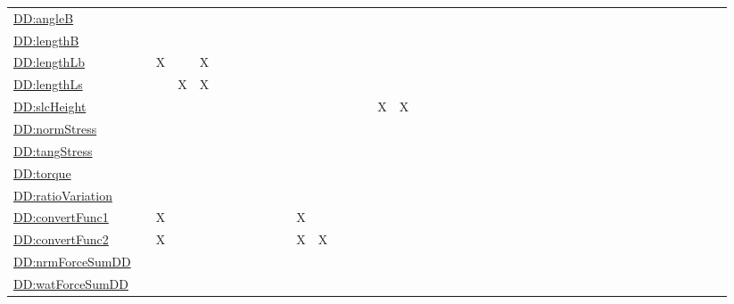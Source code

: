 \documentclass[12pt]{article}
\begin{document}
\begin{longtable}{l l l l l l l l l l l l l l l l l l l l l l l l l l l l l l l l l l l l l l l l l l l}
\\
\hyperref[DD:angleB]{DD:angleB} &  &  &  &  &  &  &  &  &  &  &  &  &  &  &  &  &  &  &  &  &  &  &  &  &  &  &  &  &  &  &  &  &  &  &  &  &  &  &  &  &  & 
\\
\hyperref[DD:lengthB]{DD:lengthB} &  &  &  &  &  &  &  &  &  &  &  &  &  &  &  &  &  &  &  &  &  &  &  &  &  &  &  &  &  &  &  &  &  &  &  &  &  &  &  &  &  & 
\\
\hyperref[DD:lengthLb]{DD:lengthLb} &  & X &  & X &  &  &  &  &  &  &  &  &  &  &  &  &  &  &  &  &  &  &  &  &  &  &  &  &  &  &  &  &  &  &  &  &  &  &  &  &  & 
\\
\hyperref[DD:lengthLs]{DD:lengthLs} &  &  & X & X &  &  &  &  &  &  &  &  &  &  &  &  &  &  &  &  &  &  &  &  &  &  &  &  &  &  &  &  &  &  &  &  &  &  &  &  &  & 
\\
\hyperref[DD:slcHeight]{DD:slcHeight} &  &  &  &  &  &  &  &  &  &  &  &  &  &  &  & X & X &  &  &  &  &  &  &  &  &  &  &  &  &  &  &  &  &  &  &  &  &  &  &  &  & 
\\
\hyperref[DD:normStress]{DD:normStress} &  &  &  &  &  &  &  &  &  &  &  &  &  &  &  &  &  &  &  &  &  &  &  &  &  &  &  &  &  &  &  &  &  &  &  &  &  &  &  &  &  & 
\\
\hyperref[DD:tangStress]{DD:tangStress} &  &  &  &  &  &  &  &  &  &  &  &  &  &  &  &  &  &  &  &  &  &  &  &  &  &  &  &  &  &  &  &  &  &  &  &  &  &  &  &  &  & 
\\
\hyperref[DD:torque]{DD:torque} &  &  &  &  &  &  &  &  &  &  &  &  &  &  &  &  &  &  &  &  &  &  &  &  &  &  &  &  &  &  &  &  &  &  &  &  &  &  &  &  &  & 
\\
\hyperref[DD:ratioVariation]{DD:ratioVariation} &  &  &  &  &  &  &  &  &  &  &  &  &  &  &  &  &  &  &  &  &  &  &  &  &  &  &  &  &  &  &  &  &  &  &  &  &  &  &  &  &  & 
\\
\hyperref[DD:convertFunc1]{DD:convertFunc1} &  & X &  &  &  &  &  &  &  &  & X &  &  &  &  &  &  &  &  &  &  &  &  &  &  &  &  &  &  &  &  &  &  &  &  &  &  &  &  &  &  & 
\\
\hyperref[DD:convertFunc2]{DD:convertFunc2} &  & X &  &  &  &  &  &  &  &  & X & X &  &  &  &  &  &  &  &  &  &  &  &  &  &  &  &  &  &  &  &  &  &  &  &  &  &  &  &  &  & 
\\
\hyperref[DD:nrmForceSumDD]{DD:nrmForceSumDD} &  &  &  &  &  &  &  &  &  &  &  &  &  &  &  &  &  &  &  &  &  &  &  &  &  &  &  &  &  &  &  &  &  &  &  &  &  &  &  &  &  & 
\\
\hyperref[DD:watForceSumDD]{DD:watForceSumDD} &  &  &  &  &  &  &  &  &  &  &  &  &  &  &  &  &  &  &  &  &  &  &  &  &  &  &  &  &  &  &  &  &  &  &  &  &  &  &  &  &  & 

\end{longtable}
\end{document}
